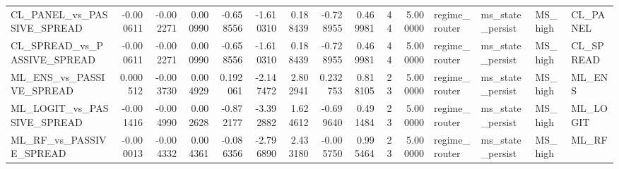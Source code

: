 \begin{table}
\begin{tabular}{lrrrrrrrrrrllll}
CL_PANEL_vs_PASSIVE_SPREAD & -0.000611 & -0.002271 & 0.000990 & -0.658556 & -1.610310 & 0.188439 & -0.728955 & 0.469981 & 44 & 5.000000 & regime_router & ms_state_persist & MS_high & CL_PANEL \\
CL_SPREAD_vs_PASSIVE_SPREAD & -0.000611 & -0.002271 & 0.000990 & -0.658556 & -1.610310 & 0.188439 & -0.728955 & 0.469981 & 44 & 5.000000 & regime_router & ms_state_persist & MS_high & CL_SPREAD \\
ML_ENS_vs_PASSIVE_SPREAD & 0.000512 & -0.003730 & 0.004929 & 0.192061 & -2.147472 & 2.802941 & 0.232753 & 0.818105 & 23 & 5.000000 & regime_router & ms_state_persist & MS_high & ML_ENS \\
ML_LOGIT_vs_PASSIVE_SPREAD & -0.001416 & -0.004990 & 0.002628 & -0.872177 & -3.392882 & 1.624612 & -0.699640 & 0.491484 & 23 & 5.000000 & regime_router & ms_state_persist & MS_high & ML_LOGIT \\
ML_RF_vs_PASSIVE_SPREAD & -0.000013 & -0.004332 & 0.004361 & -0.086356 & -2.796890 & 2.433180 & -0.005750 & 0.995464 & 23 & 5.000000 & regime_router & ms_state_persist & MS_high & ML_RF \\
\bottomrule
\end{tabular}
\end{table}
